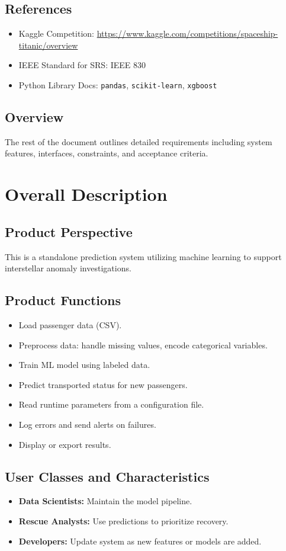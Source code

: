 \documentclass[15pt]{article}
\begin{document}
\subsection{References}
\begin{itemize}
  \item Kaggle Competition: \url{https://www.kaggle.com/competitions/spaceship-titanic/overview}
  \item IEEE Standard for SRS: IEEE 830
  \item Python Library Docs: \texttt{pandas}, \texttt{scikit-learn}, \texttt{xgboost}
\end{itemize}

\subsection{Overview}
The rest of the document outlines detailed requirements including system features, interfaces, constraints, and acceptance criteria.

\section{Overall Description}
\subsection{Product Perspective}
This is a standalone prediction system utilizing machine learning to support interstellar anomaly investigations.

\subsection{Product Functions}
\begin{itemize}
  \item Load passenger data (CSV).
  \item Preprocess data: handle missing values, encode categorical variables.
  \item Train ML model using labeled data.
  \item Predict transported status for new passengers.
  \item Read runtime parameters from a configuration file.
  \item Log errors and send alerts on failures.
  \item Display or export results.
\end{itemize}

\subsection{User Classes and Characteristics}
\begin{itemize}
  \item \textbf{Data Scientists:} Maintain the model pipeline.
  \item \textbf{Rescue Analysts:} Use predictions to prioritize recovery.
  \item \textbf{Developers:} Update system as new features or models are added.
\end{itemize}
\end{document}
